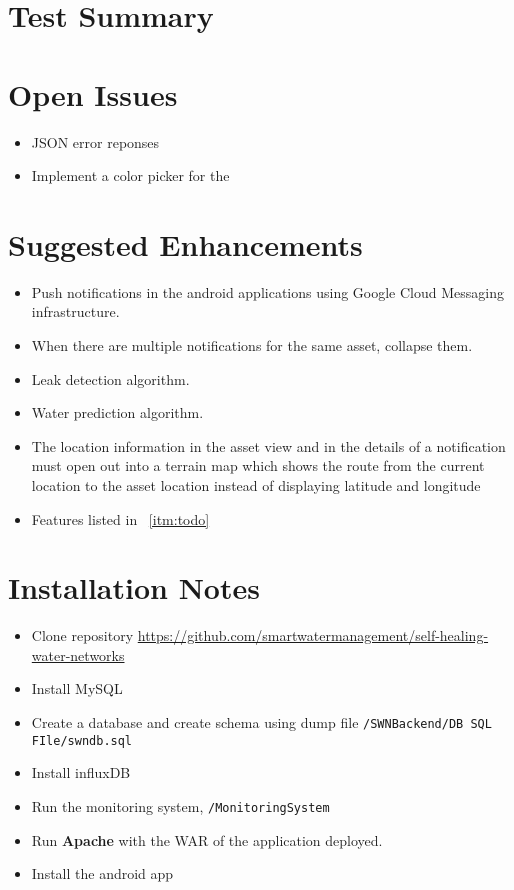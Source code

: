 \documentclass[11pt]{report} %
\begin{document}
\chapter{Test Summary}
\chapter{Open Issues}
\begin{itemize}
\item JSON error reponses
\item Implement a color picker for the 
\end{itemize}
\chapter{Suggested Enhancements}
\begin{itemize}
\item Push notifications in the android applications using Google Cloud Messaging infrastructure.
\item When there are multiple notifications for the same asset, collapse them.
\item Leak detection algorithm.
\item Water prediction algorithm.
\item The location information in the asset view and in the details of a notification must open out into a terrain map which shows the route from the current location to the asset location instead of displaying latitude and longitude
\item Features listed in ~\ref{itm:todo}
\end{itemize}
\chapter{Installation Notes}
\begin{itemize}
\item Clone repository \url {https://github.com/smartwatermanagement/self-healing-water-networks}
\item Install MySQL
\item Create a database and create schema using dump file  \texttt{/SWNBackend/DB SQL FIle/swndb.sql}
\item Install influxDB
\item Run the monitoring system, \texttt{/MonitoringSystem}
\item Run \textbf{Apache} with the WAR of the application deployed.
\item Install the android app 
\end{itemize}
\end{document}
